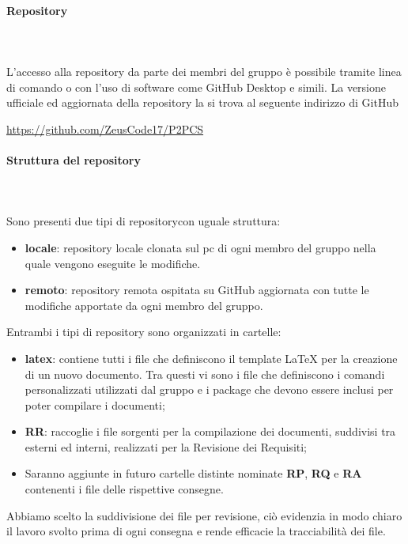 	\paragraph{Repository} \mbox{}\\ \mbox{}\\
	L'accesso alla repository da parte dei membri del gruppo è possibile tramite linea di comando o con l'uso di software come GitHub Desktop e simili.
	La versione ufficiale ed aggiornata della repository la si trova al seguente indirizzo di GitHub \newline \newline
	\centerline{\url{https://github.com/ZeusCode17/P2PCS}}
	\paragraph{Struttura del repository} \mbox{}\\ \mbox{}\\
	Sono presenti due tipi di repository\glosp con uguale struttura:
	\begin{itemize}
		\item \textbf{locale}: repository locale clonata sul pc di ogni membro del gruppo nella quale vengono eseguite le modifiche.
		\item \textbf{remoto}: repository remota ospitata su GitHub aggiornata con tutte le modifiche apportate da ogni membro del gruppo.
	\end{itemize}			
	Entrambi i tipi di repository sono organizzati in cartelle:
	\begin{itemize}
		\item \textbf{latex}: contiene tutti i file che definiscono il template \LaTeX{} per la creazione di un nuovo documento. Tra questi vi sono i file che definiscono i comandi personalizzati utilizzati dal gruppo e i package che devono essere inclusi per poter compilare i documenti;
		\item \textbf{RR}: raccoglie i file sorgenti per la compilazione dei documenti, suddivisi tra esterni ed interni, realizzati per la Revisione dei Requisiti;
		\item Saranno aggiunte in futuro cartelle distinte nominate \textbf{RP}, \textbf{RQ} e \textbf{RA} contenenti i file delle rispettive consegne.
	\end{itemize}
	Abbiamo scelto la suddivisione dei file per revisione, ciò evidenzia in modo chiaro il lavoro svolto prima di ogni consegna e rende efficacie la tracciabilità dei file.
